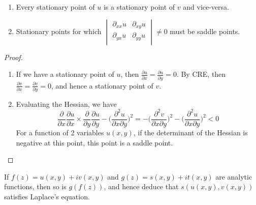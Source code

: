 \documentclass[a4paper]{article}
\begin{document}
\begin{prop}\leavevmode
\begin{enumerate}
    \item Every stationary point of $u$ is a stationary point of $v$ and vice-versa.
    \item Stationary points for which
        $\begin{vmatrix}\partial_{xx}u&\partial_{xy}u\\\partial_{yx}u&\partial_{yy}u\\\end{vmatrix}\neq0$ must be saddle points.
\end{enumerate}
\end{prop}
\begin{proof}\leavevmode
\begin{enumerate}
    \item If we have a stationary point of $u$, then $\frac{\partial u}{\partial x}=\frac{\partial u}{\partial y}=0$. By CRE, then $\frac{\partial v}{\partial x}=\frac{\partial v}{\partial y}=0$, and hence a stationary point of $v$.
    \item Evaluating the Hessian, we have
$$\frac{\partial}{\partial x}\frac{\partial u}{\partial x}\times\frac{\partial}{\partial y}\frac{\partial u}{\partial y}-\bigg(\frac{\partial^2u}{\partial x\partial y}\bigg)^2=-\bigg(\frac{\partial^2v}{\partial x\partial y}\bigg)^2-\bigg(\frac{\partial^2u}{\partial x\partial y}\bigg)^2<0$$
For a function of 2 variables $u(x,y)$, if the determinant of the Hessian is negative at this point, this point is a saddle point.
\end{enumerate}
\end{proof}
\begin{cor}
If $f(z)=u(x,y)+iv(x,y)$ and $g(z)=s(x,y)+it(x,y)$ are analytic functions, then so is $g(f(z))$, and hence deduce that $s(u(x,y),v(x,y))$ satisfies Laplace's equation.
\end{cor}
\end{document}
